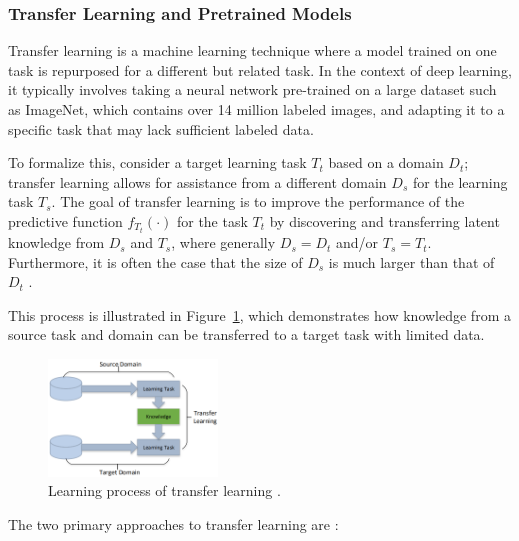 \subsubsection{Transfer Learning and Pretrained Models}

Transfer learning is a machine learning technique where a model trained on one task is repurposed for a different but related task. In the context of deep learning, it typically involves taking a neural network pre-trained on a large dataset such as ImageNet, which contains over 14 million labeled images, and adapting it to a specific task that may lack sufficient labeled data.

To formalize this, consider a target learning task \( T_t \) based on a domain \( D_t \); transfer learning allows for assistance from a different domain \( D_s \) for the learning task \( T_s \). The goal of transfer learning is to improve the performance of the predictive function \( f_{T_t}(\cdot) \) for the task \( T_t \) by discovering and transferring latent knowledge from \( D_s \) and \( T_s \), where generally \( D_s = D_t \) and/or \( T_s = T_t \). Furthermore, it is often the case that the size of \( D_s \) is much larger than that of \( D_t \) \parencite{tan2018survey}.

This process is illustrated in Figure~\ref{fig:figure14}, which demonstrates how knowledge from a source task and domain can be transferred to a target task with limited data.

\begin{figure}[H] %
    \centering
    \includegraphics[width=0.4\textwidth]{chapters/chapter1/images/Figure14.png}
    \caption{Learning process of transfer learning \parencite{tan2018survey}.}
    \label{fig:figure14}
\end{figure}
The two primary approaches to transfer learning are \parencite{tan2018survey}:

